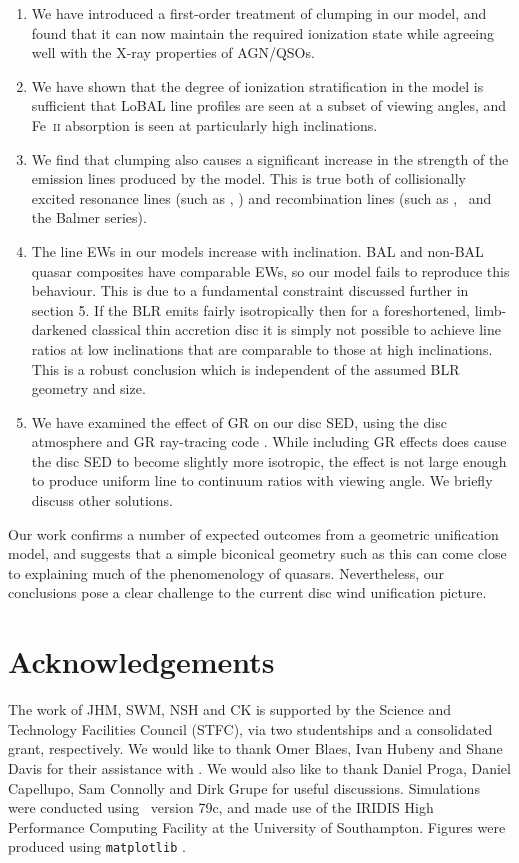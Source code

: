 \documentclass[useAMS,usenatbib]{mn2e_x}
\begin{document}
\begin{enumerate}
\item We have introduced a first-order treatment 
of clumping in our model, and found that it can now maintain
the required ionization state while agreeing well with the X-ray
properties of AGN/QSOs.
\smallskip
\item We have shown that the degree of ionization stratification
in the model is sufficient that LoBAL line profiles
are seen at a subset of viewing angles, and Fe~\textsc{ii}
absorption is seen at particularly high inclinations.
\smallskip
\item We find that clumping also causes a significant 
increase in the strength of the  emission
lines produced by the model. This is true both
of collisionally excited resonance lines (such as \civ, \nv)
and recombination lines (such as \la, \ha\ and the Balmer series).
\smallskip
\item The line EWs in our models increase with inclination.
BAL and non-BAL quasar composites have comparable EWs, so our model
fails to reproduce this behaviour.
This is due to a fundamental constraint discussed further in section 5. If the BLR
emits fairly isotropically then for a foreshortened, limb-darkened classical thin accretion disc
it is simply not possible to achieve line ratios at low inclinations that are comparable to
those at high inclinations. This is a robust conclusion which 
is independent of the assumed BLR geometry and size.
\smallskip
\item We have examined the effect of GR on our disc SED, using the disc atmosphere
and GR ray-tracing code \agn. While including GR effects
does cause the disc SED to become slightly more isotropic,
the effect is not large enough to produce uniform line to continuum ratios
with viewing angle. We briefly discuss other solutions.
\end{enumerate}
Our work confirms a number of expected outcomes from a geometric unification 
model, and suggests that a simple biconical geometry such as this can come close to 
explaining much of the  phenomenology of quasars. Nevertheless, our conclusions pose 
a clear challenge to the current disc wind unification picture.




\section*{Acknowledgements}

The work of JHM, SWM, NSH and CK is supported by the 
Science and Technology Facilities Council (STFC), 
via two studentships and a consolidated grant, respectively.
We would like to thank Omer Blaes, Ivan Hubeny and Shane Davis for their
assistance with \agn. We would also like to thank Daniel Proga, 
Daniel Capellupo, Sam Connolly and Dirk Grupe for useful discussions.
Simulations were conducted using \py\ version 79c, and made use of
the IRIDIS High Performance Computing Facility at the University of Southampton.
Figures were produced using {\tt matplotlib} \citep{matplotlib}.
\end{document}

